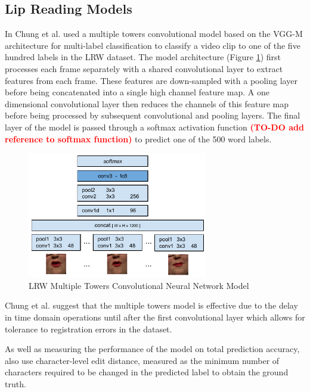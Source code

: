 \documentclass[12pt]{report}
\begin{document}
\subsection{Lip Reading Models}
In \cite{Chung2016} Chung et al. used a multiple towers convolutional model based on the VGG-M architecture for multi-label classification to classify a video clip to one of the five hundred labels in the LRW dataset.
The model architecture (Figure \ref{fig:LRW_Multiple_Towers}) first processes each frame separately with a shared convolutional layer to extract features from each frame.
These features are down-sampled with a pooling layer before being concatenated into a single high channel feature map.
A one dimensional convolutional layer then reduces the channels of this feature map before being processed by subsequent convolutional and pooling layers.
The final layer of the model is passed through a softmax activation function \textcolor{red}{\textbf{(TO-DO add reference to softmax function)}} to predict one of the 500 word labels.

\begin{figure}[h]
    \centering
        \includegraphics[width=0.7\textwidth]{figures/lrw_multiple_towers.png}
    \caption{LRW Multiple Towers Convolutional Neural Network Model \cite{Chung2016}}\label{fig:LRW_Multiple_Towers}
\end{figure}

Chung et al. suggest that the multiple towers model is effective due to the delay in time domain operations until after the first convolutional layer which allows for tolerance to registration errors in the dataset.

As well as measuring the performance of the model on total prediction accuracy, \cite{Chung2016} also use character-level edit distance, measured as the minimum number of characters required to be changed in the predicted label to obtain the ground truth.
\end{document}
